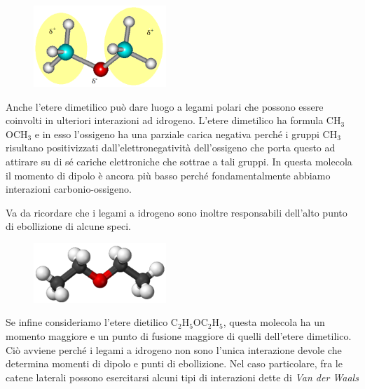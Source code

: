 \hspace{0.5cm}\begin{minipage}{0.35 \textwidth}
    \begin{figure}[H]
        \includegraphics[width=5cm]{immagini/etere_dimetilico.png}
    \end{figure}
\end{minipage}
\begin{minipage}{0.6 \textwidth}
    \vspace{0.6cm}Anche l'etere dimetilico può dare luogo a legami polari che possono essere coinvolti in ulteriori interazioni ad idrogeno. L'etere dimetilico ha formula CH$_3$OCH$_3$ e in esso l'ossigeno ha una parziale carica negativa perché i gruppi CH$_3$ risultano positivizzati dall'elettronegatività dell'ossigeno che porta questo ad attirare su di sé cariche elettroniche che sottrae a tali gruppi. In questa molecola il momento di dipolo è ancora più basso perché fondamentalmente abbiamo interazioni carbonio-ossigeno.
\end{minipage}

Va da ricordare che i legami a idrogeno sono inoltre responsabili dell'alto punto di ebollizione di alcune speci.

\hspace{0.5cm}\begin{minipage}{0.35 \textwidth}
    \begin{figure}[H]
        \includegraphics[width=5cm]{immagini/etere_dietilico.png}
    \end{figure}
\end{minipage}
\begin{minipage}{0.6 \textwidth}
    \vspace{0.6cm}Se infine consideriamo l'etere dietilico C$_2$H$_5$OC$_2$H$_5$, questa molecola ha un momento maggiore e un punto di fusione maggiore di quelli dell'etere dimetilico. Ciò avviene perché i legami a idrogeno non sono l'unica interazione devole che determina momenti di dipolo e punti di ebollizione. Nel caso particolare, fra le catene laterali possono esercitarsi alcuni tipi di interazioni dette di \textit{Van der Waals}
\end{minipage}

